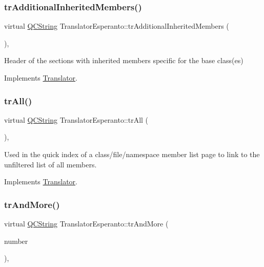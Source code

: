 \subsubsection{\texorpdfstring{trAdditionalInheritedMembers()}{trAdditionalInheritedMembers()}}
{\footnotesize\ttfamily virtual \mbox{\hyperlink{class_q_c_string}{Q\+C\+String}} Translator\+Esperanto\+::tr\+Additional\+Inherited\+Members (\begin{DoxyParamCaption}{ }\end{DoxyParamCaption})\hspace{0.3cm}{\ttfamily [inline]}, {\ttfamily [virtual]}}

Header of the sections with inherited members specific for the base class(es) 

Implements \mbox{\hyperlink{class_translator}{Translator}}.

\mbox{\label{class_translator_esperanto_ab14013b6f99fd35b51013a95de39a30f}} 
\subsubsection{\texorpdfstring{trAll()}{trAll()}}
{\footnotesize\ttfamily virtual \mbox{\hyperlink{class_q_c_string}{Q\+C\+String}} Translator\+Esperanto\+::tr\+All (\begin{DoxyParamCaption}{ }\end{DoxyParamCaption})\hspace{0.3cm}{\ttfamily [inline]}, {\ttfamily [virtual]}}

Used in the quick index of a class/file/namespace member list page to link to the unfiltered list of all members. 

Implements \mbox{\hyperlink{class_translator}{Translator}}.

\mbox{\label{class_translator_esperanto_a6e7c58663437fff2ff2937bdcbc72fe8}} 
\subsubsection{\texorpdfstring{trAndMore()}{trAndMore()}}
{\footnotesize\ttfamily virtual \mbox{\hyperlink{class_q_c_string}{Q\+C\+String}} Translator\+Esperanto\+::tr\+And\+More (\begin{DoxyParamCaption}\item[{const \mbox{\hyperlink{class_q_c_string}{Q\+C\+String}} \&}]{number }\end{DoxyParamCaption})\hspace{0.3cm}{\ttfamily [inline]}, {\ttfamily [virtual]}}

